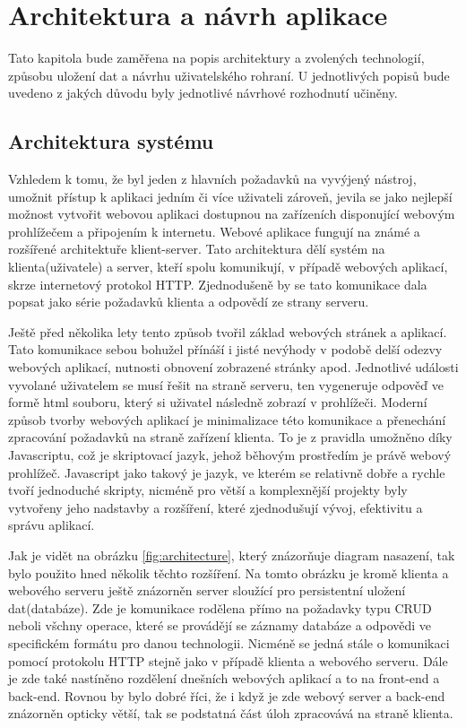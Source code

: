 \chapter{Architektura a návrh aplikace}
\label{sec:navrh}
Tato kapitola bude zaměřena na popis architektury a zvolených technologií, způsobu uložení dat a návrhu uživatelského rohraní. U jednotlivých popisů bude uvedeno z jakých důvodu byly jednotlivé návrhové rozhodnutí učiněny. 

\section{Architektura systému}
Vzhledem k tomu, že byl jeden z hlavních požadavků na vyvýjený nástroj, umožnit přístup k aplikaci jedním či více uživateli zároveň, jevila se jako nejlepší možnost vytvořit webovou aplikaci dostupnou na zařízeních disponující webovým prohlížečem a připojením k internetu. Webové aplikace fungují na známé a rozšířené architektuře klient-server. Tato architektura dělí systém na klienta(uživatele) a server, kteří spolu komunikují, v případě webových aplikací, skrze internetový protokol HTTP. Zjednodušeně by se tato komunikace dala popsat jako série požadavků klienta a odpovědí ze strany serveru. 

Ještě před několika lety tento způsob tvořil základ webových stránek a aplikací. Tato komunikace sebou bohužel přínáší i jisté nevýhody v podobě delší odezvy webových aplikací, nutnosti obnovení zobrazené stránky apod. Jednotlivé události vyvolané uživatelem se musí řešit na straně serveru, ten vygeneruje odpověď ve formě html souboru, který si uživatel následně zobrazí v prohlížeči. Moderní způsob tvorby webových aplikací je minimalizace této komunikace a přenechání zpracování požadavků na straně zařízení klienta. To je z pravidla umožněno díky Javascriptu, což je skriptovací jazyk, jehož běhovým prostředím je právě webový prohlížeč. Javascript jako takový je jazyk, ve kterém se relativně dobře a rychle tvoří jednoduché skripty, nicméně pro větší a komplexnější projekty byly vytvořeny jeho nadstavby a rozšíření, které zjednodušují vývoj, efektivitu a správu aplikací. 

Jak je vidět na obrázku \ref{fig:architecture}, který znázorňuje diagram nasazení, tak bylo použito hned několik těchto rozšíření. Na tomto obrázku je kromě klienta a webového serveru ještě znázorněn server sloužící pro persistentní uložení dat(databáze). Zde je komunikace rodělena přímo na požadavky typu CRUD neboli všchny operace, které se provádějí se záznamy databáze a odpovědi ve specifickém formátu pro danou technologii. Nicméně se jedná stále o komunikaci pomocí protokolu HTTP stejně jako v případě klienta a webového serveru. Dále je zde také nastíněno rozdělení dnešních webových aplikací a to na front-end a back-end. Rovnou by bylo dobré říci, že i když je zde webový server a back-end znázorněn opticky větší, tak se podstatná část úloh zpracovává na straně klienta. 

